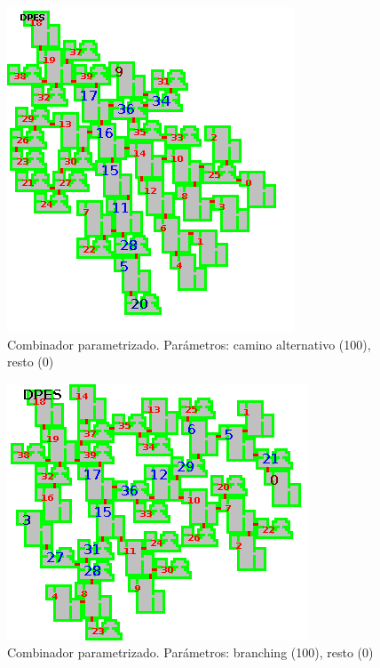 \begin{figure}[H]
\centering
\includegraphics[scale=1]{img/mapsamples/altpathlength}
\caption{Combinador parametrizado. Parámetros: camino alternativo (100), resto (0)
\label{fig:grfaltpath}}
\end{figure}



\begin{figure}[H]
\centering
\includegraphics[scale=1]{img/mapsamples/branching}
\caption{Combinador parametrizado. Parámetros: branching (100), resto (0)
\label{fig:grfbranching}}
\end{figure}



